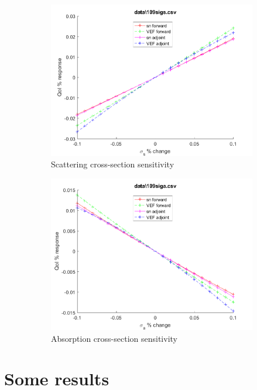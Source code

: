 \documentclass{article}
\begin{document}
\begin{figure}[H]
\begin{subfigure}{.5\textwidth}
  \includegraphics[width=.98\linewidth]{IanProposal/figures2/109sigsSens.png}
  \caption{Scattering cross-section sensitivity}
  \label{fig:sfig2}
\end{subfigure}%
\begin{subfigure}{.5\textwidth}
  \centering
  \includegraphics[width=.98\linewidth]{IanProposal/figures2/109sigaSens.png}
  \caption{Absorption cross-section sensitivity}
  \label{fig:sfig5}
\end{subfigure}%
\caption{}
\label{fig:fig}
\end{figure}

\section{Some results}
\newpage
\end{document}
